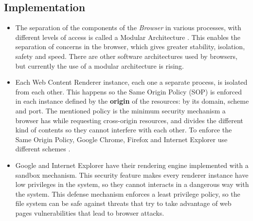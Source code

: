 \documentclass[prodmode,acmtecs]{acmsmall}
\begin{document}
    

  \subsection*{Implementation}
    \begin{itemize}\leftskip0.2em
      \item The separation of the components of the \textit{Browser} in various processes, with different levels of access is called a Modular Architecture \cite{Vrbanec2013}. This enables the separation of concerns in the browser, which gives greater stability, isolation, safety and speed. There are other software architectures used by browsers, but currently the use of a modular architecture is rising.
      \item Each Web Content Renderer instance, each one a separate process, is isolated \cite{GoogleChromeIsolation,FirefoxThreatModel} from each other. This happens so the Same Origin Policy (SOP) \cite{W3C-SOP} is enforced in each instance defined by the \textbf{origin} of the resources: by its domain, scheme and port. The mentioned policy  is the minimum security mechanism a browser has while requesting cross-origin resources, and divides the different kind of contents so they cannot interfere with each other. To enforce the Same Origin Policy, Google Chrome, Firefox and Internet Explorer use different schemes \cite{Crowley2010,Reis2009,Jackson2008}.
      \item Google and Internet Explorer have their rendering engine implemented with a sandbox mechanism. This security feature makes every renderer instance have low privileges in the system, so they cannot interacts in a dangerous way with the system. This defense mechanism enforces a least privilege policy, so the file system can be safe against threats that try to take advantage of web pages vulnerabilities that lead to browser attacks.
    \end{itemize}
\end{document}
